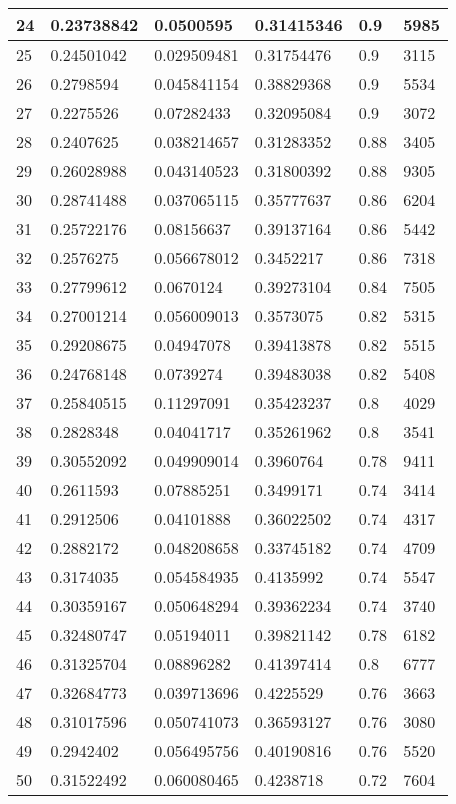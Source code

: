 \begin{longtable}{|l|l|l|l|l|l|}
24 & 0.23738842 & 0.0500595 & 0.31415346 & 0.9 & 5985 \\ \hline 
25 & 0.24501042 & 0.029509481 & 0.31754476 & 0.9 & 3115 \\ \hline 
26 & 0.2798594 & 0.045841154 & 0.38829368 & 0.9 & 5534 \\ \hline 
27 & 0.2275526 & 0.07282433 & 0.32095084 & 0.9 & 3072 \\ \hline 
28 & 0.2407625 & 0.038214657 & 0.31283352 & 0.88 & 3405 \\ \hline 
29 & 0.26028988 & 0.043140523 & 0.31800392 & 0.88 & 9305 \\ \hline 
30 & 0.28741488 & 0.037065115 & 0.35777637 & 0.86 & 6204 \\ \hline 
31 & 0.25722176 & 0.08156637 & 0.39137164 & 0.86 & 5442 \\ \hline 
32 & 0.2576275 & 0.056678012 & 0.3452217 & 0.86 & 7318 \\ \hline 
33 & 0.27799612 & 0.0670124 & 0.39273104 & 0.84 & 7505 \\ \hline 
34 & 0.27001214 & 0.056009013 & 0.3573075 & 0.82 & 5315 \\ \hline 
35 & 0.29208675 & 0.04947078 & 0.39413878 & 0.82 & 5515 \\ \hline 
36 & 0.24768148 & 0.0739274 & 0.39483038 & 0.82 & 5408 \\ \hline 
37 & 0.25840515 & 0.11297091 & 0.35423237 & 0.8 & 4029 \\ \hline 
38 & 0.2828348 & 0.04041717 & 0.35261962 & 0.8 & 3541 \\ \hline 
39 & 0.30552092 & 0.049909014 & 0.3960764 & 0.78 & 9411 \\ \hline 
40 & 0.2611593 & 0.07885251 & 0.3499171 & 0.74 & 3414 \\ \hline 
41 & 0.2912506 & 0.04101888 & 0.36022502 & 0.74 & 4317 \\ \hline 
42 & 0.2882172 & 0.048208658 & 0.33745182 & 0.74 & 4709 \\ \hline 
43 & 0.3174035 & 0.054584935 & 0.4135992 & 0.74 & 5547 \\ \hline 
44 & 0.30359167 & 0.050648294 & 0.39362234 & 0.74 & 3740 \\ \hline 
45 & 0.32480747 & 0.05194011 & 0.39821142 & 0.78 & 6182 \\ \hline 
46 & 0.31325704 & 0.08896282 & 0.41397414 & 0.8 & 6777 \\ \hline 
47 & 0.32684773 & 0.039713696 & 0.4225529 & 0.76 & 3663 \\ \hline 
48 & 0.31017596 & 0.050741073 & 0.36593127 & 0.76 & 3080 \\ \hline 
49 & 0.2942402 & 0.056495756 & 0.40190816 & 0.76 & 5520 \\ \hline 
50 & 0.31522492 & 0.060080465 & 0.4238718 & 0.72 & 7604 \\ \hline 
\end{longtable}